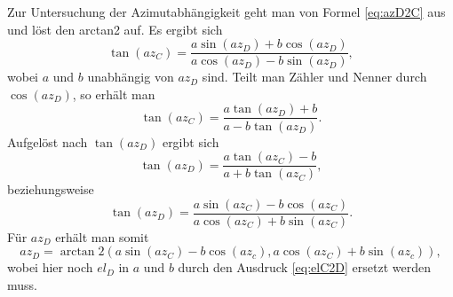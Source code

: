 Zur Untersuchung der Azimutabhängigkeit geht man von Formel \ref{eq:azD2C} aus und löst den arctan2 auf. Es ergibt sich
\begin{equation}
\tan\left(az_C\right)=\frac{a\sin\left(az_D\right)+b\cos\left(az_D\right)}{a\cos\left(az_D\right)-b\sin\left(az_D\right)},
\end{equation}
wobei $a$ und $b$ unabhängig von $az_D$ sind. Teilt man Zähler und Nenner durch $\cos\left(az_D\right)$, so erhält man
\begin{equation}
\tan\left(az_C\right)=\frac{a\tan\left(az_D\right)+b}{a-b\tan\left(az_D\right)}.
\end{equation}
Aufgelöst nach $\tan\left(az_D\right)$ ergibt sich
\begin{equation}
\tan\left(az_D\right)=\frac{a\tan\left(az_C\right)-b}{a+b\tan\left(az_C\right)},
\end{equation}
beziehungsweise
\begin{equation}
\tan\left(az_D\right)=\frac{a\sin\left(az_C\right)-b\cos\left(az_C\right)}{a\cos\left(az_C\right)+b\sin\left(az_C\right)}.
\end{equation}
Für $az_D$ erhält man somit 
\begin{equation}
az_D=\arctan 2\left(
a\sin\left(az_C\right)-b\cos\left(az_c\right),a\cos\left(az_C\right)+b\sin\left(az_c\right)\right),
\label{eq:azC2D}
\end{equation}
wobei hier noch $el_D$ in $a$ und $b$ durch den Ausdruck \ref{eq:elC2D} ersetzt werden muss.

